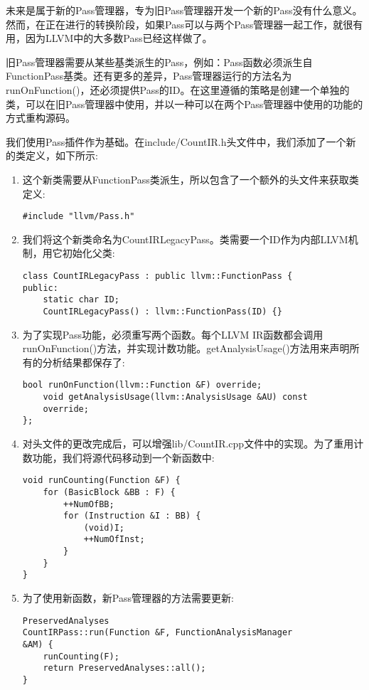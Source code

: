 
未来是属于新的Pass管理器，专为旧Pass管理器开发一个新的Pass没有什么意义。然而，在正在进行的转换阶段，如果Pass可以与两个Pass管理器一起工作，就很有用，因为LLVM中的大多数Pass已经这样做了。\par

旧Pass管理器需要从某些基类派生的Pass，例如：Pass函数必须派生自FunctionPass基类。还有更多的差异，Pass管理器运行的方法名为runOnFunction()，还必须提供Pass的ID。在这里遵循的策略是创建一个单独的类，可以在旧Pass管理器中使用，并以一种可以在两个Pass管理器中使用的功能的方式重构源码。\par

我们使用Pass插件作为基础。在include/CountIR.h头文件中，我们添加了一个新的类定义，如下所示:\par

\begin{enumerate}
\item 这个新类需要从FunctionPass类派生，所以包含了一个额外的头文件来获取类定义:
\begin{lstlisting}[caption={}]
#include "llvm/Pass.h"
\end{lstlisting}
	
\item 我们将这个新类命名为CountIRLegacyPass。类需要一个ID作为内部LLVM机制，用它初始化父类:
\begin{lstlisting}[caption={}]
class CountIRLegacyPass : public llvm::FunctionPass {
public:
	static char ID;
	CountIRLegacyPass() : llvm::FunctionPass(ID) {}
\end{lstlisting}
		
\item 为了实现Pass功能，必须重写两个函数。每个LLVM IR函数都会调用runOnFunction()方法，并实现计数功能。getAnalysisUsage()方法用来声明所有的分析结果都保存了:
\begin{lstlisting}[caption={}]
	bool runOnFunction(llvm::Function &F) override;
	void getAnalysisUsage(llvm::AnalysisUsage &AU) const 
	override;
};
\end{lstlisting}
	
\item 对头文件的更改完成后，可以增强lib/CountIR.cpp文件中的实现。为了重用计数功能，我们将源代码移动到一个新函数中:
\begin{lstlisting}[caption={}]
void runCounting(Function &F) {
	for (BasicBlock &BB : F) {
		++NumOfBB;
		for (Instruction &I : BB) {
			(void)I;
			++NumOfInst;
		}
	}
}
\end{lstlisting}
	
\item 为了使用新函数，新Pass管理器的方法需要更新:
\begin{lstlisting}[caption={}]
PreservedAnalyses
CountIRPass::run(Function &F, FunctionAnalysisManager 
&AM) {
	runCounting(F);
	return PreservedAnalyses::all();
}
\end{lstlisting}
	

\end{enumerate}
